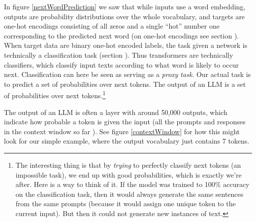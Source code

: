 In figure \ref{nextWordPrediction} we saw that while inputs use a word embedding, outputs are probability distributions over the whole vocabulary, and targets are one-hot encodings consisting of all zeros and a single ``hot'' number one corresponding to the predicted next word (on one-hot encodings see section ). When target data are binary one-hot encoded labels, the task given a network is technically a classification task (section ). Thus transformers are technically classifiers, which classify input texts according to what word is likely to occur next. Classification can here be seen as serving as a \emph{proxy task}. Our actual task is to predict a set of probabilities over next tokens. The output of an LLM is a set of probabilities over next tokens.\footnote{The interesting thing is that by \emph{trying} to perfectly classify next tokens (an impossible task), we end up with good probabilities, which is exactly we're after. Here is a way to think of it. If the model was trained to 100\% accuracy on the classification task, then it would always generate the same sentences from the same prompts (because it would assign one unique token to the current input). But then it could not generate new instances of text.}

The output of an LLM is often a  layer with around 50,000 outputs, which  indicate how probable a token is given the input (all the prompts and responses in the context window so far ). See figure \ref{contextWindow} for how this might look for our simple example, where the output vocabulary just contains 7 tokens.

